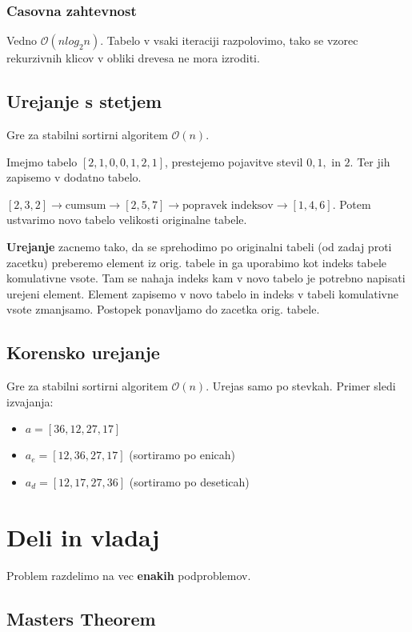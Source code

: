 \documentclass{article}
\begin{document}
\begin{multicols}{2}
\subsubsection{Casovna zahtevnost}
Vedno $\mathcal{O}(nlog_2n)$. Tabelo v vsaki iteraciji razpolovimo, tako se vzorec rekurzivnih klicov v obliki drevesa ne mora izroditi.

\subsection{Urejanje s stetjem}
Gre za stabilni sortirni algoritem $\mathcal{O}(n)$.

Imejmo tabelo $[2, 1, 0, 0, 1,  2, 1]$, prestejemo pojavitve stevil $0, 1, \text{ in } 2$. Ter jih zapisemo v dodatno tabelo.

$[2, 3, 2] \rightarrow \text{cumsum} \rightarrow [2, 5 , 7] \rightarrow  \text{popravek indeksov} \rightarrow [1, 4, 6]$.
Potem ustvarimo novo tabelo velikosti originalne tabele.

\textbf{Urejanje} zacnemo tako, da se sprehodimo po originalni tabeli (od zadaj proti zacetku) preberemo element iz orig. tabele in ga uporabimo kot indeks tabele komulativne vsote. Tam se nahaja indeks kam v novo tabelo je potrebno napisati urejeni element. Element zapisemo v novo tabelo in indeks v tabeli komulativne vsote zmanjsamo. Postopek ponavljamo do zacetka orig. tabele.

\subsection{Korensko urejanje}
Gre za stabilni sortirni algoritem $\mathcal{O}(n)$.
Urejas samo po stevkah.
Primer sledi izvajanja:
\begin{itemize}
    \item $a = [36, 12, 27, 17]$
    \item $a_e = [12, 36, 27, 17]$ (sortiramo po enicah)
    \item $a_d = [12, 17, 27, 36]$ (sortiramo po deseticah)
\end{itemize}

\section{Deli in vladaj}
Problem razdelimo na vec \textbf{enakih} podproblemov. 

\subsection{Masters Theorem}


\end{multicols}
\end{document}
